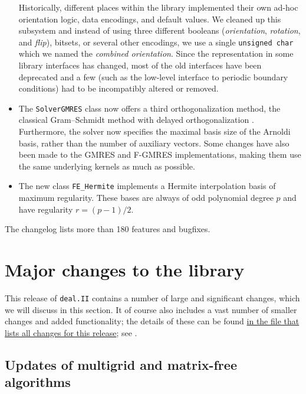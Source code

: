 \documentclass{ansarticle-preprint}
\newcommand{\specialword}[1]{\texttt{#1}}
\newcommand{\dealii}{{\specialword{deal.II}}\xspace}
\begin{document}
\begin{itemize}
    Historically, different places within the library implemented their own
    ad-hoc orientation logic, data encodings, and default values. We cleaned up
    this subsystem and instead of using three different booleans
    (\emph{orientation}, \emph{rotation}, and \emph{flip}), bitsets, or several
    other encodings, we use a single \texttt{unsigned char} which we named the
    \emph{combined orientation}. Since the representation in some library
    interfaces has changed, most of the old interfaces have been deprecated and
    a few (such as the low-level interface to periodic boundary conditions) had
    to be incompatibly altered or removed.
\item The \texttt{SolverGMRES} class now offers a third orthogonalization
  method, the classical Gram--Schmidt method with delayed orthogonalization
  \cite{Bielich2022}. Furthermore, the solver now specifies the maximal basis
  size of the Arnoldi basis, rather than the number of auxiliary
  vectors. Some changes have also been made to the GMRES and F-GMRES
  implementations, making them use the same underlying kernels as much as possible.
\item The new class \texttt{FE\_Hermite} implements a Hermite interpolation basis of
  maximum regularity. These bases are always of odd polynomial degree $p$ and have
  regularity $r=(p-1)/2$.
\end{itemize}
%
The changelog lists more than 180 features and bugfixes.


\section{Major changes to the library}
\label{sec:major}

This release of \dealii contains a number of large and significant changes,
which we will discuss in this section.
It of course also includes a
vast number of smaller changes and added functionality; the details of these
can be found
\href{https://dealii.org/developer/doxygen/deal.II/changes_between_9_5_2_and_9_6_0.html}
{in the file that lists all changes for this release}; see \cite{changes96}.



\subsection{Updates of multigrid and matrix-free algorithms}\label{sec:mf}
\end{document}
